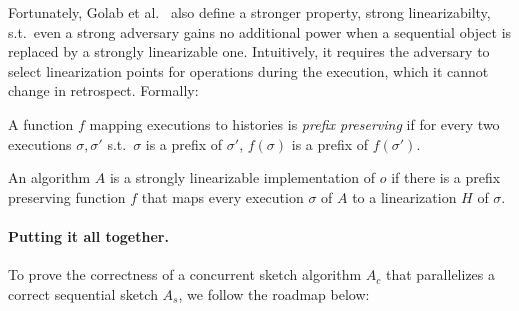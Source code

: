 Fortunately, Golab et al.~\cite{Wojciech} also define a stronger property, {strong linearizabilty}, s.t.\
even a strong adversary gains no additional power
when a sequential object is replaced by a strongly linearizable one. 
Intuitively,  it requires the adversary to select linearization points for operations 
during the execution, which it cannot change  in retrospect. 
Formally:
\begin{definition}
A function $f$ mapping executions to  histories is \emph{prefix preserving} if
for every  two executions $\sigma, \sigma'$ s.t.\ $\sigma$ is a prefix of $\sigma'$,  $f(\sigma)$ is a prefix of $f(\sigma')$.

An algorithm $A$ is a strongly linearizable implementation of $o$
if there is a prefix preserving function $f$ that maps every 
execution $\sigma$ of $A$ to a linearization $H$ of $\sigma$.
\end{definition}

 
 \paragraph{Putting it all together.} 
 
To prove the correctness of a concurrent sketch algorithm
$A_c$ that parallelizes a correct sequential sketch  $A_s$, we
 follow the  roadmap below:

